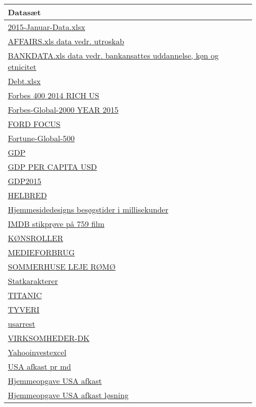 \documentclass[]{book}
\begin{document}
\begin{longtable}[]{@{}l@{}}
\toprule
Datasæt\tabularnewline
\midrule
\endhead
\href{https://drive.google.com/uc?export=download\&id=0B1E7VnhxsDMldkt1OUx6LTEyMXM}{2015-Januar-Data.xlsx}\tabularnewline
\href{https://drive.google.com/uc?export=download\&id=0B1E7VnhxsDMlRlVQcFBtdVlHZ1U}{AFFAIRS.xls data vedr. utroskab}\tabularnewline
\href{https://drive.google.com/uc?export=download\&id=0B1E7VnhxsDMlRENKWWxlNlBXbmM}{BANKDATA.xls data vedr. bankansattes uddannelse, køn og etnicitet}\tabularnewline
\href{https://drive.google.com/uc?export=download\&id=0B1E7VnhxsDMlUGdpNXZjWm1sNk0}{Debt.xlsx}\tabularnewline
\href{https://drive.google.com/uc?export=download\&id=0B1E7VnhxsDMlYTRWVWozb09PRTQ}{Forbes 400 2014 RICH US}\tabularnewline
\href{https://drive.google.com/uc?export=download\&id=0B1E7VnhxsDMlNEdtLUV3NFJTSkk}{Forbes-Global-2000 YEAR 2015}\tabularnewline
\href{https://drive.google.com/uc?export=download\&id=0B1E7VnhxsDMlNTkzeVJlQV81OHM}{FORD FOCUS}\tabularnewline
\href{https://drive.google.com/uc?export=download\&id=0B1E7VnhxsDMlQm51dXNjM3NmdE0}{Fortune-Global-500}\tabularnewline
\href{https://drive.google.com/uc?export=download\&id=0B1E7VnhxsDMlQUhPbEgxdmJhZTg}{GDP}\tabularnewline
\href{https://drive.google.com/uc?export=download\&id=0B1E7VnhxsDMlSVkweHBpT19GZjg}{GDP PER CAPITA USD}\tabularnewline
\href{https://drive.google.com/uc?export=download\&id=0B1E7VnhxsDMlamdFSkk4SWU4eWM}{GDP2015}\tabularnewline
\href{https://drive.google.com/uc?export=download\&id=0B1E7VnhxsDMlMTM1UUNMdzdoUm8}{HELBRED}\tabularnewline
\href{https://drive.google.com/uc?export=download\&id=0B1E7VnhxsDMlS3Y5ZUhROU9iNnM}{Hjemmesidedesigns besøgstider i millisekunder}\tabularnewline
\href{https://drive.google.com/uc?export=download\&id=0B1E7VnhxsDMlWlFNLTVoMEU1WHM}{IMDB stikprøve på 759 film}\tabularnewline
\href{https://drive.google.com/uc?export=download\&id=0B1E7VnhxsDMlalR4TGdjSkV0RzA}{KØNSROLLER}\tabularnewline
\href{https://drive.google.com/uc?export=download\&id=0B1E7VnhxsDMlSTFXM1pCMUtjc2M}{MEDIEFORBRUG}\tabularnewline
\href{https://drive.google.com/uc?export=download\&id=0B1E7VnhxsDMlOWNjUzlQd0s4TVE}{SOMMERHUSE LEJE RØMØ}\tabularnewline
\href{https://drive.google.com/uc?export=download\&id=0B1E7VnhxsDMlRURnNjk0UnJSYzQ}{Statkarakterer}\tabularnewline
\href{https://drive.google.com/uc?export=download\&id=0B1E7VnhxsDMlYWJOOG5yamNoOTQ}{TITANIC}\tabularnewline
\href{https://drive.google.com/uc?export=download\&id=0B1E7VnhxsDMlMFZJdm5QdXpGTGc}{TYVERI}\tabularnewline
\href{https://drive.google.com/uc?export=download\&id=0B1E7VnhxsDMlRDhUYUk4R0NwVFk}{usarrest}\tabularnewline
\href{https://drive.google.com/uc?export=download\&id=0B1E7VnhxsDMlVmxHTDltNk1VSG8}{VIRKSOMHEDER-DK}\tabularnewline
\href{https://drive.google.com/uc?export=download\&id=0B1E7VnhxsDMlYnFpbWp1YTBlLVE}{Yahooinvestexcel}\tabularnewline
\href{https://drive.google.com/uc?export=download\&id=0B1E7VnhxsDMldVZtS2tzV0RqVjQ}{USA afkast pr md}\tabularnewline
\href{https://drive.google.com/uc?export=download\&id=0B1E7VnhxsDMlekM5eVRYZkdUZnc}{Hjemmeopgave USA afkast}\tabularnewline
\href{https://drive.google.com/uc?export=download\&id=0B1E7VnhxsDMlSDNPZi1zSTlqNk0}{Hjemmeopgave USA afkast løsning}\tabularnewline
\bottomrule
\end{longtable}
\end{document}
